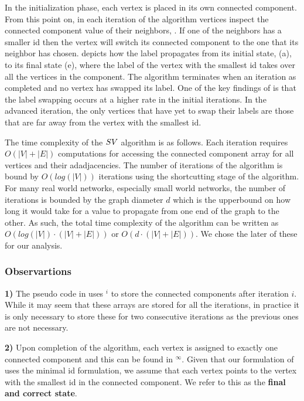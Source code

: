 In the initialization phase, each vertex is placed in its own connected component. From this point 
on, in each iteration of the algorithm vertices inspect the connected component value of their 
neighbors, \CCVAL. If one of the neighbors has a smaller id then the vertex will switch its 
connected component to the one that its neighbor has chosen.  depicts 
how the label propagates from its initial state,  (a), to its final 
state  (e), where the label of the vertex with the smallest id takes 
over all the vertices in the component.  The algorithm terminates when an iteration as completed 
and no vertex has swapped its \CCVAL label.
One of the key findings of \cite{greenbranchavoiding} is 
that the label swapping occurs at a higher rate in the initial iterations. In the advanced 
iteration, the only vertices that have yet to swap their labels are those that are far away from the 
vertex with the smallest id.


The time complexity of the $SV$ algorithm is as follows. Each iteration requires $O(|V|+|E|)$ 
computations for accessing the connected component array for all vertices and their adadjacencies. 
The number of iterations of the algorithm is bound by $O(log(|V|))$ iterations 
\cite{ShiloachVishkin} using the shortcutting stage of the algorithm. For many real world networks, 
especially small world networks, the number of iterations is bounded by the graph diameter $d$ which 
is the upperbound on how long it would take for a value to propagate from one end of the graph to 
the other. As such, the total time complexity of the algorithm can be written as $O(log(|V|) \cdot 
(|V|+|E|))$ or $O(d \cdot (|V|+|E|))$. We chose the later of these for our analysis. 


\subsubsection*{Observartions}

{\bf 1)} The pseudo code in  uses \CCVAL$^i$ to store the 
connected components after iteration $i$. While it may seem that these arrays are stored for all 
the iterations, in practice it is only necessary to store these for two consecutive 
iterations as the previous ones are not necessary.

{\bf 2)} Upon completion of the algorithm, each vertex is assigned to exactly one connected 
component and this can be found in \CCVAL$^\infty$. Given that our formulation of \sv uses the 
minimal id formulation, we assume that each vertex points to the vertex with the smallest 
id in the connected component. We refer to this as the {\bf final and correct state}.

